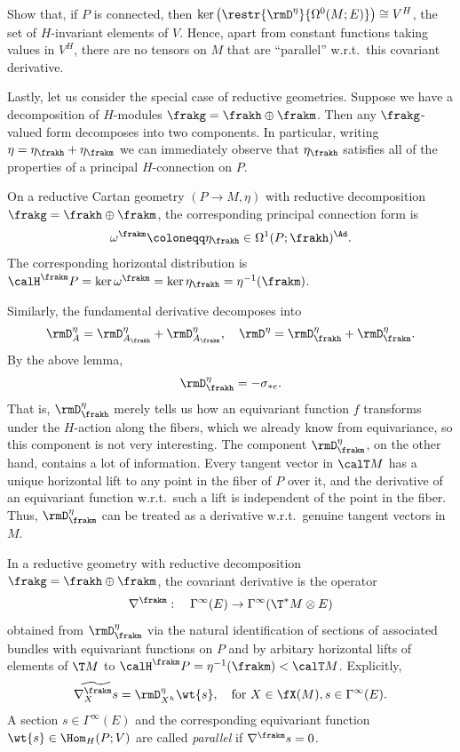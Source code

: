 \begin{xca}
    Show that, if $P$ is connected, then $\ker\left(\restr{\rmD^\eta}{\Omega^0(M;E)}\right)\cong V^H$, the set of $H$-invariant elements of $V$. Hence, apart from constant functions taking values in $V^H$, there are no tensors on $M$ that are ``parallel'' w.r.t.\ this covariant derivative.
\end{xca}

Lastly, let us consider the special case of reductive geometries. Suppose we have a decomposition of $H$-modules $\frakg=\frakh\oplus\frakm$. Then any $\frakg$-valued form decomposes into two components. In particular, writing $\eta=\eta_\frakh+\eta_\frakm$ we can immediately observe that $\eta_\frakh$ satisfies all of the properties of a principal $H$-connection on $P$. 

\begin{defn}
    On a reductive Cartan geometry $(P\to M,\eta)$ with reductive decomposition $\frakg=\frakh\oplus\frakm$, the corresponding  principal connection form is 
    \[\omega^\frakm\coloneqq \eta_\frakh\in\Omega^1(P;\frakh)^\Ad.\]
    The corresponding horizontal distribution is $\calH^\frakm P=\ker\omega^\frakm=\ker\eta_\frakh=\eta^{-1}(\frakm)$.
\end{defn}

Similarly, the fundamental derivative decomposes into 
\[\rmD^\eta_A=\rmD^\eta_{A_\frakh}+\rmD^\eta_{A_\frakm},\quad \rmD^\eta=\rmD^\eta_\frakh+\rmD^\eta_\frakm.\] 
By the above lemma,
\[\rmD^\eta_\frakh=-\sigma_{\ast e}.\]
That is, $\rmD^\eta_\frakh$ merely tells us how an equivariant function $f$ transforms under the $H$-action along the fibers, which we already know from equivariance, so this component is not very interesting. The component $\rmD^\eta_\frakm$, on the other hand, contains a lot of information. Every tangent vector in $\calT M$ has a unique horizontal lift to any point in the fiber of $P$ over it, and the derivative of an equivariant function w.r.t.\ such a lift is independent of the point in the fiber. Thus, $\rmD^\eta_\frakm$ can be treated as a derivative w.r.t.\ genuine tangent vectors in $M$.

\begin{defn}
    In a reductive geometry with reductive decomposition $\frakg=\frakh\oplus\frakm$, the covariant derivative is the operator 
    \[\nabla^\frakm:\quad \Gamma^\infty(E)\to \Gamma^\infty(\T^\ast M\otimes E)\]
    obtained from $\rmD^\eta_\frakm$ via the natural identification of sections of associated bundles with equivariant functions on $P$ and by arbitary horizontal lifts of elements of $\T M$ to $\calH^\frakm P=\eta^{-1}(\frakm)<\calT M$. Explicitly,
    \[\widetilde{\nabla^\frakm_X s}=\rmD^\eta_{X^h}\wt{s}, \quad \text{for }X\in\fX(M),s\in\Gamma^\infty(E).\]
    A section $s\in\Gamma^\infty(E)$ and the corresponding equivariant function $\wt{s}\in\Hom_H(P;V)$ are called \emph{parallel} if $\nabla^\frakm s=0$.
\end{defn}


